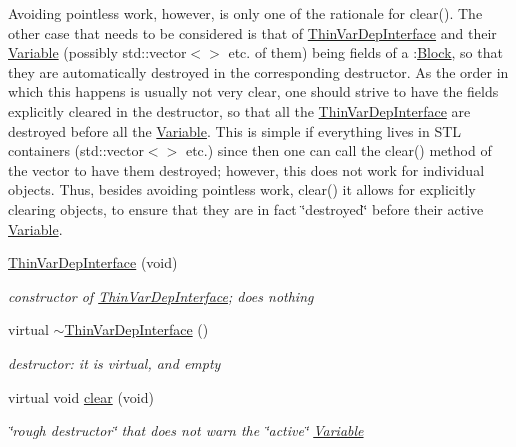 Avoiding pointless work, however, is only one of the rationale for clear(). The other case that needs to be considered is that of \mbox{\hyperlink{class_s_m_spp__di__unipi__it_1_1_thin_var_dep_interface}{Thin\+Var\+Dep\+Interface}} and their \mbox{\hyperlink{class_s_m_spp__di__unipi__it_1_1_variable}{Variable}} (possibly std\+::vector$<$$>$ etc. of them) being fields of a \+:\mbox{\hyperlink{class_s_m_spp__di__unipi__it_1_1_block}{Block}}, so that they are automatically destroyed in the corresponding destructor. As the order in which this happens is usually not very clear, one should strive to have the fields explicitly cleared in the destructor, so that all the \mbox{\hyperlink{class_s_m_spp__di__unipi__it_1_1_thin_var_dep_interface}{Thin\+Var\+Dep\+Interface}} are destroyed before all the \mbox{\hyperlink{class_s_m_spp__di__unipi__it_1_1_variable}{Variable}}. This is simple if everything lives in S\+TL containers (std\+::vector$<$$>$ etc.) since then one can call the clear() method of the vector to have them destroyed; however, this does not work for individual objects. Thus, besides avoiding pointless work, clear() it allows for explicitly clearing objects, to ensure that they are in fact \char`\"{}destroyed\char`\"{} before their active \mbox{\hyperlink{class_s_m_spp__di__unipi__it_1_1_variable}{Variable}}. \begin{DoxyCompactItemize}
\item 
\mbox{\label{group___thin_var_dep_interface___c_l_a_s_s_e_s_gae23264aae375852a624548a912161e7f}} 
\mbox{\hyperlink{group___thin_var_dep_interface___c_l_a_s_s_e_s_gae23264aae375852a624548a912161e7f}{Thin\+Var\+Dep\+Interface}} (void)
\begin{DoxyCompactList}\small\item\em constructor of \mbox{\hyperlink{class_s_m_spp__di__unipi__it_1_1_thin_var_dep_interface}{Thin\+Var\+Dep\+Interface}}; does nothing \end{DoxyCompactList}\item 
virtual \mbox{\hyperlink{group___thin_var_dep_interface___c_l_a_s_s_e_s_ga627c883f11bd4f9b137b397be90d3996}{$\sim$\+Thin\+Var\+Dep\+Interface}} ()
\begin{DoxyCompactList}\small\item\em destructor\+: it is virtual, and empty \end{DoxyCompactList}\item 
virtual void \mbox{\hyperlink{group___thin_var_dep_interface___c_l_a_s_s_e_s_gae16067de85b435fac4ce8558b193a99a}{clear}} (void)
\begin{DoxyCompactList}\small\item\em \char`\"{}rough destructor\char`\"{} that does not warn the \char`\"{}active\char`\"{} \mbox{\hyperlink{class_s_m_spp__di__unipi__it_1_1_variable}{Variable}} \end{DoxyCompactList}\end{DoxyCompactItemize}
